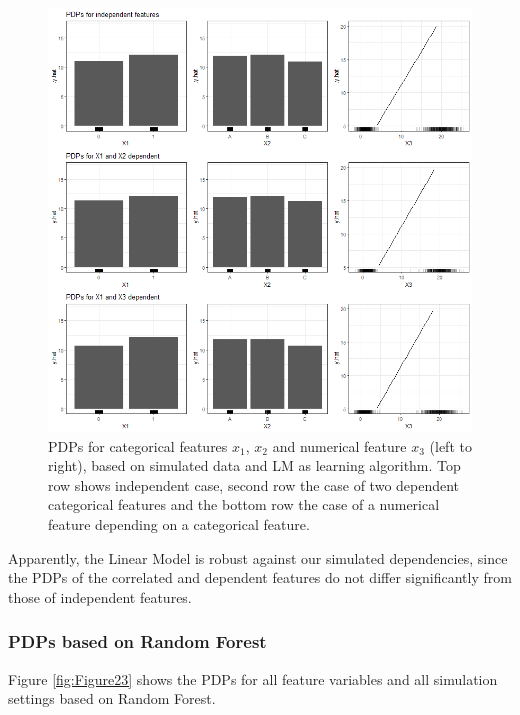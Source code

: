 \documentclass[
]{krantz}
\begin{document}
\begin{figure}

\includegraphics[width=1\linewidth]{images/VK_PDP_22_Set4_LM} \hfill{}

\caption{PDPs for categorical features $x_1$, $x_2$ and numerical feature $x_3$ (left to right), based on simulated data and LM as learning algorithm. Top row shows independent case, second row the case of two dependent categorical features and the bottom row the case of a numerical feature depending on a categorical feature.}\label{fig:Figure22}
\end{figure}

Apparently, the Linear Model is robust against our simulated dependencies, since the PDPs of the correlated and dependent features do not differ significantly from those of independent features.

\hypertarget{pdps-based-on-random-forest-3}{%
\subsubsection{PDPs based on Random Forest}\label{pdps-based-on-random-forest-3}}

Figure \ref{fig:Figure23} shows the PDPs for all feature variables and all simulation settings based on Random Forest.
\end{document}
